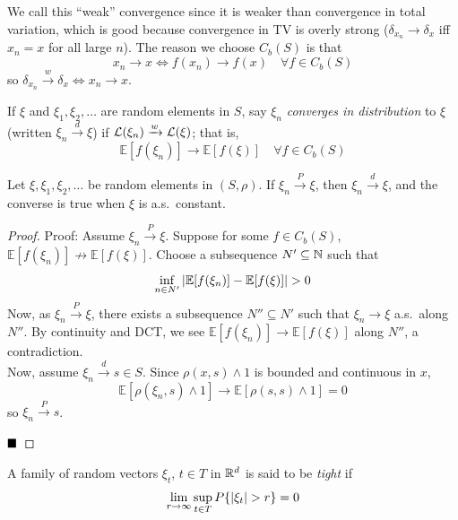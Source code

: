 We call this ``weak'' convergence since it is weaker than convergence in total variation, which is good because convergence in TV is overly strong ($\delta_{x_n} \to \delta_x$ iff $x_n = x$ for all large $n$). The reason we choose $C_b(S)$ is that
\[ x_n \to x \iff f(x_n) \to f(x) \quad \forall f \in C_b(S) \]
so $\delta_{x_n} \xrightarrow{w} \delta_x \iff x_n \to x$.

\begin{definition}
    If $\xi$ and $\xi_1, \xi_2, \ldots$ are random elements in $S$, say $\xi_n$ \emph{converges in distribution} to $\xi$ (written $\xi_n \xrightarrow{d} \xi$) if $\cal{L}(\xi_n) \xrightarrow{w} \cal{L}(\xi)$; that is,
    \[ \mathbb{E}[f(\xi_n)] \to \mathbb{E}[f(\xi)] \quad \forall f \in C_b(S) \]
\end{definition}

\begin{lemma}
    Let $\xi, \xi_1, \xi_2, \ldots$ be random elements in $(S, \rho)$. If $\xi_n \xrightarrow{P} \xi$, then $\xi_n \xrightarrow{d} \xi$, and the converse is true when $\xi$ is a.s.\ constant.
\end{lemma}
\begin{proof}{Proof:}
    Assume $\xi_n \xrightarrow{P} \xi$. Suppose for some $f \in C_b(S)$, $\mathbb{E}[f(\xi_n)] \not\to \mathbb{E}[f(\xi)]$. Choose a subsequence $N' \subseteq \N$ such that
    \[ \inf_{n \in N'} \abs{\mathbb{E}[f(\xi_n)] - \mathbb{E}[f(\xi)]} > 0 \]
    Now, as $\xi_n \xrightarrow{P} \xi$, there exists a subsequence $N'' \subseteq N'$ such that $\xi_n \to \xi$ a.s.\ along $N''$. By continuity and DCT, we see $\mathbb{E}[f(\xi_n)] \to \mathbb{E}[f(\xi)]$ along $N''$, a contradiction.\\

    Now, assume $\xi_n \xrightarrow{d} s \in S$. Since $\rho(x, s) \wedge 1$ is bounded and continuous in $x$,
    \[ \mathbb{E}[\rho(\xi_n, s) \wedge 1] \to \mathbb{E}[\rho(s, s) \wedge 1] = 0 \]
    so $\xi_n \xrightarrow{P} s$.

    $\qed$
\end{proof}

\begin{definition}
    A family of random vectors $\xi_t$, $t \in T$ in $\R^d$ is said to be \emph{tight} if
    \[ \lim_{r \to \infty} \sup_{t \in T} P\{\abs{\xi_t} > r\} = 0 \]
\end{definition}

